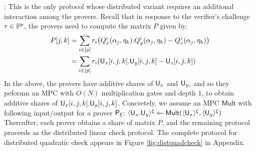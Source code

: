 : This is the only protocol whose distributed variant requires an additional interaction among the provers. Recall that in response to the verifier’s challenge $r\in \mathbb{F}^p$, the provers need to compute the matrix $P$ given by:
\begin{align*}
P[j,k] & =\sum_{i\in
[p]}r_i\big(Q_x^i(\alpha_j,\eta_k).Q_y^i(\alpha_j,\eta_k)-Q_z^i(\alpha_j,\eta_k)\big)\\    
& = \sum_{i\in [p]}r_i(\mathsf{U}_x[i,j,k].\mathsf{U}_y[i,j,k] - \mathsf{U}_z[i,j,k])
\end{align*}    
In the above, the provers have additive shares of $\mathsf{U}_x$ and
$\mathsf{U}_y$, and so they peformn an MPC with $O(N)$ multiplication gates and
depth $1$, to obtain additive shares of $\mathsf{U}_x[i,j,k].\mathsf{U}_y[i,j,k]$.
Concretely, we assume an MPC $\mathsf{Mult}$ with following input/output for
a prover $\mathsf{P}_\xi$:     
$\langle{\mathsf{U}_x.\mathsf{U}_y}\rangle^\xi\leftarrow \mathsf{Mult}(\langle{\mathsf{U}_x}\rangle^\xi,\langle{\mathsf{U}_y}\rangle^\xi)$    
Thereafter, each prover obtains a share of matrix $P$, and the remaining protocol proceeds as
the distributed linear check protocol. 
The complete protocol for
distributed quadratic check appears in Figure \ref{fig:distquadcheck} in
Appendix.
